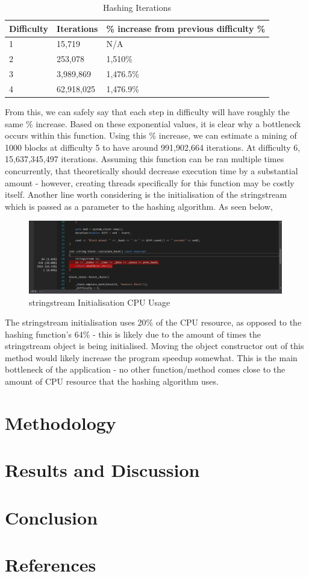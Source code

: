 \documentclass[12pt, a4paper]{article}
\begin{document}
\begin{table}[H]
    \centering
    \begin{tabular}{| l | l | l |}
    \hline
    Difficulty & Iterations & \% increase from previous difficulty \%  \\ \hline
    1 & 15,719 & N/A \\ \hline
    2 & 253,078 & 1,510\% \\ \hline
    3 & 3,989,869 & 1,476.5\% \\ \hline
    4 & 62,918,025 & 1,476.9\% \\ \hline
    \end{tabular}
    \caption{Hashing Iterations}
\end{table}

From this, we can safely say that each step in difficulty will have roughly the same \% increase. Based on these exponential values, it is clear why a bottleneck occurs within this function. Using this \% increase, we can estimate a mining of 1000 blocks at difficulty 5 to have around 991,902,664 iterations. At difficulty 6, 15,637,345,497 iterations. Assuming this function can be ran multiple times concurrently, that theoretically should decrease execution time by a substantial amount - however, creating threads specifically for this function may be costly itself. Another line worth considering is the initialisation of the stringstream which is passed as a parameter to the hashing algorithm. As seen below, \\

\begin{figure}[H]
	\centering
		\includegraphics[width=0.99\textwidth]{"stringstreamusage"}
		\caption{stringstream Initialisation CPU Usage}
\end{figure}

The stringstream initialisation uses 20\% of the CPU resource, as opposed to the hashing function's 64\% - this is likely due to the amount of times the stringstream object is being initialised. Moving the object constructor out of this method would likely increase the program speedup somewhat. This is the main bottleneck of the application - no other function/method comes close to the amount of CPU resource that the hashing algorithm uses. 

\section{Methodology}

\section{Results and Discussion}

\section{Conclusion}

\section{References}
\end{document}
